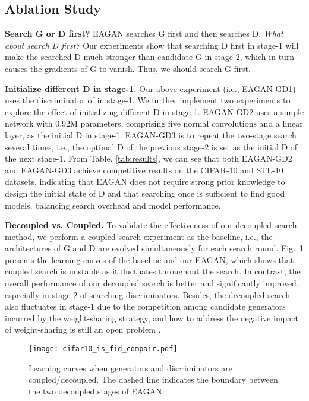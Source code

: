 \documentclass[runningheads]{llncs}
\begin{document}
\subsection{Ablation Study}\label{sec:ablation}




\textbf{Search G or D first?} EAGAN searches G first and then searches D. \textit{What about search D first?} Our experiments show that searching D first in stage-1 will make the searched D much stronger than candidate G in stage-2, which in turn causes the gradients of G to vanish. Thus, we should search G first.


\textbf{Initialize different D in stage-1.} Our above experiment (i.e., EAGAN-GD1) uses the discriminator of \cite{Adversarialnas} in stage-1. We further implement two experiments to explore the effect of initializing different D in stage-1. EAGAN-GD2 uses a simple network with 0.92M parameters, comprising five normal convolutions and a linear layer, as the initial D in stage-1. EAGAN-GD3 is to repeat the two-stage search several times, i.e., the optimal D of the previous stage-2 is set as the initial D of the next stage-1. From Table. \ref{tab:results}, we can see that both EAGAN-GD2 and EAGAN-GD3 achieve competitive results on the CIFAR-10 and STL-10 datasets, indicating that EAGAN does not require strong prior knowledge to design the initial state of D and that searching once is sufficient to find good models, balancing search overhead and model performance.






\textbf{Decoupled vs. Coupled.} To validate the effectiveness of our decoupled search method, we perform a coupled search experiment as the baseline, i.e., the architectures of G and D are evolved simultaneously for each search round. Fig.~\ref{fig:converge_compair} presents the learning curves of the baseline and our EAGAN, which shows that coupled search is unstable as it fluctuates throughout the search. In contrast, the overall performance of our decoupled search is better and significantly improved, especially in stage-2 of searching discriminators. Besides, the decoupled search also fluctuates in stage-1 due to the competition among candidate generators incurred by the weight-sharing strategy, and how to address the negative impact of weight-sharing is still an open problem \cite{xie2021weightsharing}.




\begin{figure}
    \centering
    \texttt{[image: cifar10\_is\_fid\_compair.pdf]}


    \caption{Learning curves when generators and discriminators are coupled/decoupled. The dashed line indicates the boundary between the two decoupled stages of EAGAN. }
    \label{fig:converge_compair}
\end{figure}
\end{document}

